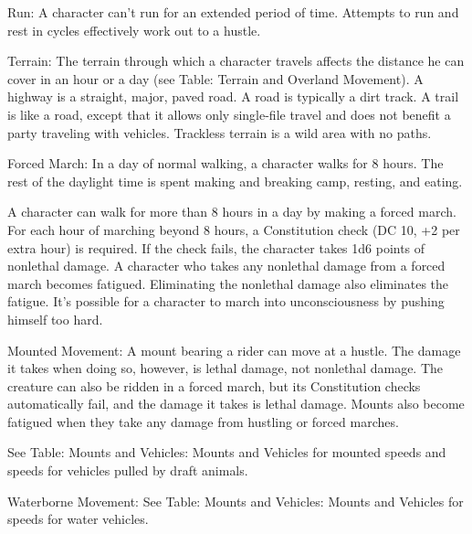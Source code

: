 Run: A character can't run for an extended period of time. Attempts to run and rest in cycles effectively work out to a hustle.
				
Terrain: The terrain through which a character travels affects the distance he can cover in an hour or a day (see Table: Terrain and Overland Movement). A highway is a straight, major, paved road. A road is typically a dirt track. A trail is like a road, except that it allows only single-file travel and does not benefit a party traveling with vehicles. Trackless terrain is a wild area with no paths.
				
Forced March: In a day of normal walking, a character walks for 8 hours. The rest of the daylight time is spent making and breaking camp, resting, and eating.
				
A character can walk for more than 8 hours in a day by making a forced march. For each hour of marching beyond 8 hours, a Constitution check (DC 10, +2 per extra hour) is required. If the check fails, the character takes 1d6 points of nonlethal damage. A character who takes any nonlethal damage from a forced march becomes fatigued. Eliminating the nonlethal damage also eliminates the fatigue. It's possible for a character to march into unconsciousness by pushing himself too hard.
				
Mounted Movement: A mount bearing a rider can move at a hustle. The damage it takes when doing so, however, is lethal damage, not nonlethal damage. The creature can also be ridden in a forced march, but its Constitution checks automatically fail, and the damage it takes is lethal damage. Mounts also become fatigued when they take any damage from hustling or forced marches.
				
See Table: Mounts and Vehicles: Mounts and Vehicles for mounted speeds and speeds for vehicles pulled by draft animals.
				
Waterborne Movement: See Table: Mounts and Vehicles: Mounts and Vehicles for speeds for water vehicles.


